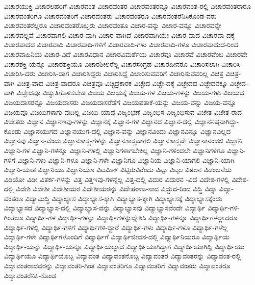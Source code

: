 {ವಿಚಾರಯುಕ್ತಿ
ವಿಚಾರಲಹರಿಗೆ
ವಿಚಾರವಂತ
ವಿಚಾರವಂತರ
ವಿಚಾರವಂತರನ್ನೂ
ವಿಚಾರವಂತ-ರಲ್ಲಿ
ವಿಚಾರವಂತರಾರೂ
ವಿಚಾರವಂತರಿಗೂ
ವಿಚಾರವಂತರಿಗೆ
ವಿಚಾರವಂತರು
ವಿಚಾರವಂತರೂ
ವಿಚಾರವಂತರೆನಿಸಿಕೊಂಡ-ವರು
ವಿಚಾರವಂತರೆಲ್ಲರೂ
ವಿಚಾರವಂತರೊಬ್ಬರು
ವಿಚಾರವಂತೂ
ವಿಚಾರ-ವನ್ನು
ವಿಚಾರ-ವನ್ನೂ
ವಿಚಾರವನ್ನೇ
ವಿಚಾರವಲ್ಲವೆ
ವಿಚಾರವಾಗಲಿ
ವಿಚಾರ-ವಾಗಿ
ವಿಚಾರ-ವಾಗಿದೆ
ವಿಚಾರವಾಗಿಯೇ
ವಿಚಾರ-ವಾದ
ವಿಚಾರವಾ-ದಕ್ಕೆ
ವಿಚಾರವಾದದ
ವಿಚಾರವಾದಿ
ವಿಚಾರವಾದಿ-ಗಳಿಗೆ
ವಿಚಾರವಾದಿ-ಗಳು
ವಿಚಾರವಾದಿ-ಗಳೂ
ವಿಚಾರವಾದುದ-ರಿಂದ
ವಿಚಾರವಾಹಿನಿಯ
ವಿಚಾರ-ವಿದೆ
ವಿಚಾರವಿಧಾನ
ವಿಚಾರವಿಮರ್ಶೆಯ
ವಿಚಾರವೂ
ವಿಚಾರವೆ
ವಿಚಾರವೆಂಬ
ವಿಚಾರವೇ
ವಿಚಾರಶಕ್ತಿ-ಯನ್ನೂ
ವಿಚಾರಶಕ್ತಿಯೂ
ವಿಚಾರಶೀಲರೆಲ್ಲ
ವಿಚಾರಸಂಗ್ರಹ
ವಿಚಾರಹೀನರೂ
ವಿಚಾರಿಸಲಾಗಿ
ವಿಚಾರಿಸಿ
ವಿಚಾರಿಸಿ-ದರು
ವಿಚಾರಿಸಿ-ದಾಗ
ವಿಚಾರಿಸಿದ್ದರು
ವಿಚಾರಿಸಿದ್ದೆ
ವಿಚಾರಿಸುವವರಿಗೆ
ವಿಚಾರಿಸುವವರಿಲ್ಲ
ವಿಚಿತ್ರ
ವಿಚಿತ್ರ-ವಾಗಿ
ವಿಚಿತ್ರ-ವಾದ
ವಿಚಿತ್ರ-ವಾದರೂ
ವಿಚಿತ್ರವೂ
ವಿಚ್ಛಿದ್ರಕಾರಕ
ವಿಚ್ಛೇದ
ವಿಚ್ಛೇ-ದಕ್ಕೆ
ವಿಚ್ಛೇದದ
ವಿಚ್ಛೇದನಕ್ಕೂ
ವಿಚ್ಛೇದ-ವಾಗಿ
ವಿಚ್ಛೇದವೂ
ವಿಚ್ಯುತಿಗೊಳಿಸಬೇಡ
ವಿಜಯ
ವಿಜಯಕ್ಕೆ
ವಿಜಯ-ಗಳ
ವಿಜಯ-ಗಳನ್ನು
ವಿಜಯ-ಗಳು
ವಿಜಯದ
ವಿಜಯದಾಸರನ್ನೂ
ವಿಜಯದಾಸರು
ವಿಜಯದಾಸರೆಡೆಗೆ
ವಿಜಯಪತಾಕೆ-ಯನ್ನು
ವಿಜಯ-ವನ್ನು
ವಿಜಯ-ವನ್ನೂ
ವಿಜಯವೂ
ವಿಜಯಿಗಳಾಗು-ವುದಿಲ್ಲ
ವಿಜಯಿ-ಯಾದ
ವಿಜೃಂಭಣೆ
ವಿಜೃಂಭಿಸ
ವಿಜೃಂಭಿಸುವ
ವಿಜೇತ
ವಿಜೇತ-ರಾದ
ವಿಜೇತರು
ವಿಜ್ಞಾನ
ವಿಜ್ಞಾನಇವು-ಗಳನ್ನು
ವಿಜ್ಞಾನಕ್ಕೆ
ವಿಜ್ಞಾನ-ಗಳ
ವಿಜ್ಞಾನದ
ವಿಜ್ಞಾನ-ದಲ್ಲಿ
ವಿಜ್ಞಾನನಿಷ್ಠನಾಗಿದ್ದು-ಕೊಂಡು
ವಿಜ್ಞಾನಯುಗದ
ವಿಜ್ಞಾನಯುಗ-ದಲ್ಲಿ
ವಿಜ್ಞಾನ-ವನ್ನು
ವಿಜ್ಞಾನವಿಂದು
ವಿಜ್ಞಾನವಿನ್ನೂ
ವಿಜ್ಞಾನವಿಲ್ಲದ
ವಿಜ್ಞಾನವು
ವಿಜ್ಞಾನ-ವೆಂದು
ವಿಜ್ಞಾನಶಾಸ್ತ್ರ-ಗಳನ್ನು
ವಿಜ್ಞಾನಶಾಸ್ತ್ರವಾಗಲಿ
ವಿಜ್ಞಾನಶಾಸ್ತ್ರವೇ
ವಿಜ್ಞಾನಾನಂದಜಿ
ವಿಜ್ಞಾನಿ
ವಿಜ್ಞಾನಿ-ಗಳ
ವಿಜ್ಞಾನಿ-ಗಳನ್ನೂ
ವಿಜ್ಞಾನಿ-ಗಳಲ್ಲಿ
ವಿಜ್ಞಾನಿಗಳಾಗಬೇಕಿಲ್ಲ
ವಿಜ್ಞಾನಿ-ಗಳಿಂದಲೇ
ವಿಜ್ಞಾನಿಗಳಿಗೂ
ವಿಜ್ಞಾನಿ-ಗಳಿಗೆ
ವಿಜ್ಞಾನಿ-ಗಳು
ವಿಜ್ಞಾನಿ-ಗಳೂ
ವಿಜ್ಞಾನಿ-ಗಳೇ
ವಿಜ್ಞಾನಿಗೂ
ವಿಜ್ಞಾನಿಯ
ವಿಜ್ಞಾನಿ-ಯಾಗಲಿ
ವಿಜ್ಞಾನಿ-ಯಾಗಿ
ವಿಜ್ಞಾನಿ-ಯಾತ
ವಿಜ್ಞಾನಿಯು
ವಿಜ್ಞಾನಿಯೂ
ವಿಟಮಿನ್
ವಿಟ್ಟಿರುವಿರೆಂದು
ವಿಟ್ಟು
ವಿಟ್ಠಲ
ವಿಠಲನ
ವಿಡಂಬನೆಯ
ವಿಡಿಯೋ
ವಿಡೀ
ವಿತರ್ಕ-ಗಳನ್ನು
ವಿತ್ತ
ವಿತ್ತಇವು-ಗಳನ್ನೆಲ್ಲ
ವಿತ್ತ-ದಲ್ಲಿ
ವಿದುರ
ವಿದುರನ
-ವಿದೆ
ವಿದೇಶ-ಗಳಲ್ಲಿ
ವಿದೇಶ-ದಲ್ಲಿ
ವಿದೇಶಿ
ವಿದೇಶೀ
ವಿದೇಶೀಯರ
ವಿದೇಶೀಯರನ್ನು
ವಿದೇಹರಾಜ-ನಾದ
ವಿದ್ದುದ-ರಿಂದ
ವಿದ್ಧಿ
ವಿದ್ಯಾ
ವಿದ್ಯಾ-ವಂತರೂ
ವಿದ್ಯಾಬುದ್ಧಿ
ವಿದ್ಯಾಭ್ಯಾಸ
ವಿದ್ಯಾಭ್ಯಾಸ-ಕ್ಕಾಗಿ
ವಿದ್ಯಾಭ್ಯಾಸ-ಕ್ಕಾಗಿ
ವಿದ್ಯಾಭ್ಯಾಸಕ್ಕೆ
ವಿದ್ಯಾಭ್ಯಾಸಕ್ಕೆಂದು
ವಿದ್ಯಾಭ್ಯಾಸದ
ವಿದ್ಯಾಭ್ಯಾಸ-ದಲ್ಲಿ
ವಿದ್ಯಾಭ್ಯಾಸ-ವನ್ನು
ವಿದ್ಯಾಭ್ಯಾಸವು
ವಿದ್ಯಾಭ್ಯಾಸವೆಂದೇ
ವಿದ್ಯಾರ್ಥಿ
ವಿದ್ಯಾರ್ಥಿ-ಗಳಿ-ಗಿಂತಲೂ
ವಿದ್ಯಾರ್ಥಿ-ಗಳ
ವಿದ್ಯಾರ್ಥಿ-ಗಳನ್ನು
ವಿದ್ಯಾರ್ಥಿಗಳನ್ನುದ್ದೇಶಿಸಿ
ವಿದ್ಯಾರ್ಥಿ-ಗಳನ್ನೂ
ವಿದ್ಯಾರ್ಥಿಗಳಲ್ಲಾದರೂ
ವಿದ್ಯಾರ್ಥಿ-ಗಳಲ್ಲಿ
ವಿದ್ಯಾರ್ಥಿ-ಗಳಿಗೆ
ವಿದ್ಯಾರ್ಥಿಗಳಿ-ದ್ದಾರೆ
ವಿದ್ಯಾರ್ಥಿ-ಗಳು
ವಿದ್ಯಾರ್ಥಿ-ಗಳೂ
ವಿದ್ಯಾರ್ಥಿ-ಗಳೆಲ್ಲ
ವಿದ್ಯಾರ್ಥಿ-ಗಳೇ
ವಿದ್ಯಾರ್ಥಿಗಳೊಂದಿಗೆ
ವಿದ್ಯಾರ್ಥಿಗೆ
ವಿದ್ಯಾರ್ಥಿಜೀವನ-ದಲ್ಲಿ
ವಿದ್ಯಾರ್ಥಿನಿಯರೂ
ವಿದ್ಯಾರ್ಥಿಯ
ವಿದ್ಯಾರ್ಥಿ-ಯನ್ನು
ವಿದ್ಯಾರ್ಥಿ-ಯನ್ನೂ
ವಿದ್ಯಾರ್ಥಿಯಲ್ಲಾದ
ವಿದ್ಯಾರ್ಥಿಯಾಗಿದ್ದಾಗ
ವಿದ್ಯಾರ್ಥಿಯಾಗಿದ್ದಿ
ವಿದ್ಯಾರ್ಥಿಯು
ವಿದ್ಯಾರ್ಥಿಯೂ
ವಿದ್ಯಾರ್ಥಿಯೊಬ್ಬ
ವಿದ್ಯಾವಂತ
ವಿದ್ಯಾವಂತನೊಬ್ಬ
ವಿದ್ಯಾವಂತರ
ವಿದ್ಯಾವಂತರನ್ನು
ವಿದ್ಯಾವಂತ-ರಲ್ಲಿ
ವಿದ್ಯಾವಂತರಾದವರನ್ನು
ವಿದ್ಯಾವಂತರಿ-ಗಿಂತ
ವಿದ್ಯಾವಂತರಿಗೂ
ವಿದ್ಯಾವಂತರಿಗೆ
ವಿದ್ಯಾವಂತರು
ವಿದ್ಯಾವಂತರೂ
ವಿದ್ಯಾವಂತರೆನಿಸಿ-ಕೊಂಡ
}
